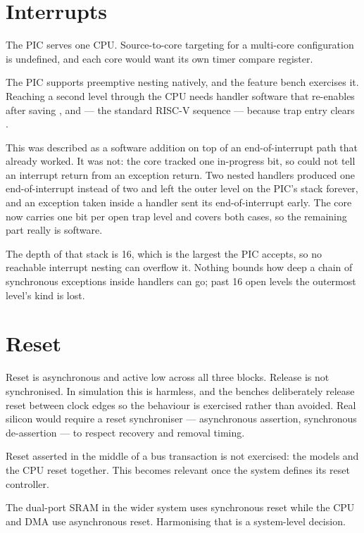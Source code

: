 \section{Interrupts}

The PIC serves one CPU. Source-to-core targeting for a multi-core configuration
is undefined, and each core would want its own timer compare register.

The PIC supports preemptive nesting natively, and the feature bench exercises it.
Reaching a second level through the CPU needs handler software that re-enables
 after saving ,  and  --- the standard
RISC-V sequence --- because trap entry clears .

This was described as a software addition on top of an end-of-interrupt path
that already worked. It was not: the core tracked one in-progress bit, so
 could not tell an interrupt return from an exception return. Two
nested handlers produced one end-of-interrupt instead of two and left the outer
level on the PIC's stack forever, and an exception taken inside a handler sent
its end-of-interrupt early. The core now carries one bit per open trap level and
 covers both cases, so the remaining part really is software.

The depth of that stack is 16, which is the largest  the PIC
accepts, so no reachable interrupt nesting can overflow it. Nothing bounds how
deep a chain of synchronous exceptions inside handlers can go; past 16 open
levels the outermost level's kind is lost.

\section{Reset}

Reset is asynchronous and active low across all three blocks. Release is not
synchronised. In simulation this is harmless, and the benches deliberately
release reset between clock edges so the behaviour is exercised rather than
avoided. Real silicon would require a reset synchroniser --- asynchronous
assertion, synchronous de-assertion --- to respect recovery and removal timing.

Reset asserted in the middle of a bus transaction is not exercised: the models
and the CPU reset together. This becomes relevant once the system defines its
reset controller.

The dual-port SRAM in the wider system uses synchronous reset while the CPU and
DMA use asynchronous reset. Harmonising that is a system-level decision.

